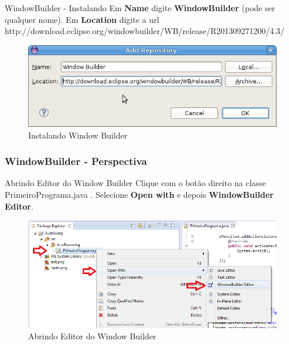 \documentclass[10pt]{beamer}
\begin{document}
\begin{frame}{WindowBuilder - Instalando }
Em \textbf{Name} digite \textbf{WindowBuilder} (pode ser qualquer nome).
\linebreak
Em \textbf{Location} digite a url 
	http://download.eclipse.org/windowbuilder/WB/release/R201309271200/4.3/
  \begin{figure}[!htb]
    \centering
    \includegraphics[scale=.3]{window_builder_url}
    \caption{Instalando Window Builder}
    \label{figRotulo}
  \end{figure}
\end{frame}{}

\subsubsection{WindowBuilder - Perspectiva }
\begin{frame}{Abrindo Editor do Window Builder}
Clique com o botão direito na classe PrimeiroPrograma.java . Selecione \textbf{Open with} e depois \textbf{WindowBuilder Editor}.
  \begin{figure}[!htb]
    \centering
    \includegraphics[scale=.4]{window_builder_perspective}
    \caption{Abrindo Editor do Window Builder}
    \label{figRotulo}
  \end{figure}
\end{frame}{}
\end{document}
